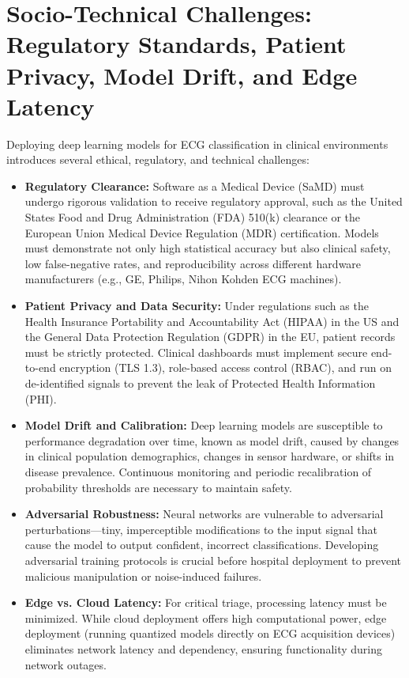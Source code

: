 \documentclass[12pt,a4paper]{report}
\begin{document}
\section{Socio-Technical Challenges: Regulatory Standards, Patient Privacy, Model Drift, and Edge Latency}
Deploying deep learning models for ECG classification in clinical environments introduces several ethical, regulatory, and technical challenges:
\begin{itemize}
    \item \textbf{Regulatory Clearance:} Software as a Medical Device (SaMD) must undergo rigorous validation to receive regulatory approval, such as the United States Food and Drug Administration (FDA) 510(k) clearance or the European Union Medical Device Regulation (MDR) certification. Models must demonstrate not only high statistical accuracy but also clinical safety, low false-negative rates, and reproducibility across different hardware manufacturers (e.g., GE, Philips, Nihon Kohden ECG machines).
    \item \textbf{Patient Privacy and Data Security:} Under regulations such as the Health Insurance Portability and Accountability Act (HIPAA) in the US and the General Data Protection Regulation (GDPR) in the EU, patient records must be strictly protected. Clinical dashboards must implement secure end-to-end encryption (TLS 1.3), role-based access control (RBAC), and run on de-identified signals to prevent the leak of Protected Health Information (PHI).
    \item \textbf{Model Drift and Calibration:} Deep learning models are susceptible to performance degradation over time, known as model drift, caused by changes in clinical population demographics, changes in sensor hardware, or shifts in disease prevalence. Continuous monitoring and periodic recalibration of probability thresholds are necessary to maintain safety.
    \item \textbf{Adversarial Robustness:} Neural networks are vulnerable to adversarial perturbations---tiny, imperceptible modifications to the input signal that cause the model to output confident, incorrect classifications. Developing adversarial training protocols is crucial before hospital deployment to prevent malicious manipulation or noise-induced failures.
    \item \textbf{Edge vs. Cloud Latency:} For critical triage, processing latency must be minimized. While cloud deployment offers high computational power, edge deployment (running quantized models directly on ECG acquisition devices) eliminates network latency and dependency, ensuring functionality during network outages.
\end{itemize}
\end{document}

